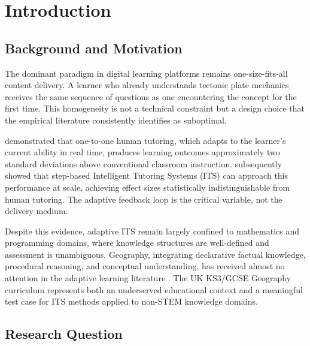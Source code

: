 \chapter{Introduction}
\label{ch:introduction}

\section{Background and Motivation}
\label{sec:intro_background}

The dominant paradigm in digital learning platforms remains one-size-fits-all
content delivery. A learner who already understands tectonic plate mechanics
receives the same sequence of questions as one encountering the concept for the
first time. This homogeneity is not a technical constraint but a design choice
that the empirical literature consistently identifies as suboptimal.

\textcite{bloom1984} demonstrated that one-to-one human tutoring, which adapts
to the learner's current ability in real time, produces learning outcomes
approximately two standard deviations above conventional classroom instruction.
\textcite{vanlehn2011} subsequently showed that step-based Intelligent Tutoring
Systems (ITS) can approach this performance at scale, achieving effect sizes
statistically indistinguishable from human tutoring. The adaptive feedback loop
is the critical variable, not the delivery medium.

Despite this evidence, adaptive ITS remain largely confined to mathematics and
programming domains, where knowledge structures are well-defined and assessment
is unambiguous. Geography, integrating declarative factual knowledge, procedural
reasoning, and conceptual understanding, has received almost no attention in the
adaptive learning literature \parencite{bednarz2013}. The UK KS3/GCSE Geography
curriculum represents both an underserved educational context and a meaningful
test case for ITS methods applied to non-STEM knowledge domains.

\section{Research Question}
\label{sec:intro_rq}

